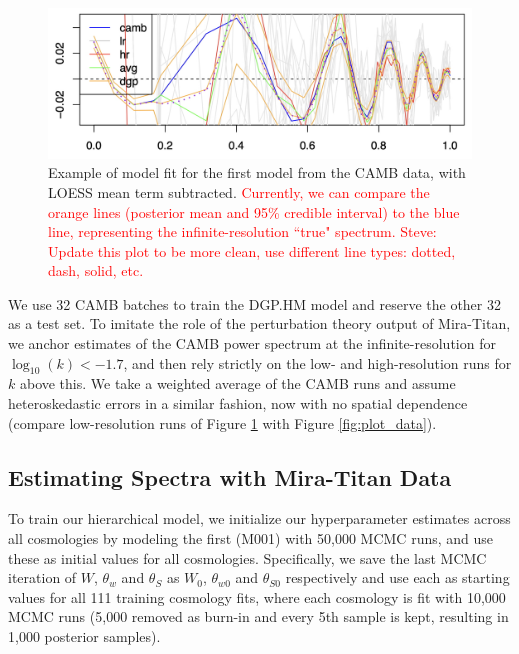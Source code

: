 \documentclass[11pt]{article}
\begin{document}
\begin{figure}
    \centering
    \includegraphics[width=6in]{CAMB_fit_model1.jpg}
    \caption{Example of model fit for the first model from the CAMB data, with LOESS
             mean term subtracted. \textcolor{red}{Currently, we can compare the 
             orange lines (posterior mean and 95\% credible interval) to the blue line,
             representing the infinite-resolution ``true" spectrum. Steve: Update this plot to be
             more clean, use different line types: dotted, dash, solid, etc.}}   
    \label{fig:fit_camb}
\end{figure}

We use 32 CAMB batches to train the DGP.HM model and reserve the other 32 as a test set.
To imitate the role of the perturbation theory output of Mira-Titan, we anchor estimates of the CAMB
power spectrum at the infinite-resolution for $\log_{10}(k) < -1.7$, and then rely 
strictly on the low- and high-resolution runs for $k$ above this. We take a weighted
average of the CAMB runs and assume heteroskedastic errors in a similar fashion, now with
no spatial dependence (compare low-resolution runs of Figure \ref{fig:fit_camb} 
with Figure \ref{fig:plot_data}).

\subsection{Estimating Spectra with Mira-Titan Data}
\label{subsec:mira_fit}

To train our hierarchical model, we initialize our hyperparameter estimates across 
all cosmologies by modeling the first (M001) with 50,000 MCMC runs, and use these 
as initial values for all cosmologies. Specifically, we save the last MCMC 
iteration of $W$, $\theta_w$ and $\theta_S$ as $W_0$, $\theta_{w0}$ and $\theta_{S0}$ 
respectively and use each as starting values for all 111 training cosmology fits, 
where each cosmology is fit with 10,000 MCMC runs (5,000 removed as burn-in and 
every 5th sample is kept, resulting in 1,000 posterior samples).
\end{document}
